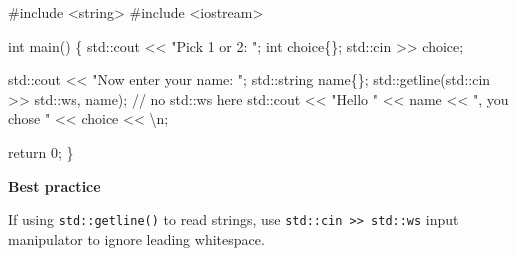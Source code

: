 \documentclass[
  letterpaper,
  DIV=11,
  numbers=noendperiod]{scrreprt}
\newenvironment{Shaded}{\begin{snugshade}}{\end{snugshade}}
\newcommand{\CommentTok}[1]{\textcolor[rgb]{0.37,0.37,0.37}{#1}}
\newcommand{\DecValTok}[1]{\textcolor[rgb]{0.68,0.00,0.00}{#1}}
\newcommand{\ErrorTok}[1]{\textcolor[rgb]{0.68,0.00,0.00}{#1}}
\newcommand{\FunctionTok}[1]{\textcolor[rgb]{0.28,0.35,0.67}{#1}}
\newcommand{\NormalTok}[1]{\textcolor[rgb]{0.00,0.23,0.31}{#1}}
\newcommand{\SpecialCharTok}[1]{\textcolor[rgb]{0.37,0.37,0.37}{#1}}
\newcommand{\StringTok}[1]{\textcolor[rgb]{0.13,0.47,0.30}{#1}}
\begin{document}
\begin{Shaded}
\begin{Highlighting}[]
\CommentTok{\#include \textless{}string\textgreater{}}
\CommentTok{\#include \textless{}iostream\textgreater{}}

\NormalTok{int }\FunctionTok{main}\NormalTok{()}
\NormalTok{\{}
\NormalTok{    std}\SpecialCharTok{::}\NormalTok{cout }\SpecialCharTok{\textless{}}\ErrorTok{\textless{}} \StringTok{"Pick 1 or 2: "}\NormalTok{;}
\NormalTok{    int choice\{\};}
\NormalTok{    std}\SpecialCharTok{::}\NormalTok{cin }\SpecialCharTok{\textgreater{}}\ErrorTok{\textgreater{}}\NormalTok{ choice;}

\NormalTok{    std}\SpecialCharTok{::}\NormalTok{cout }\SpecialCharTok{\textless{}}\ErrorTok{\textless{}} \StringTok{"Now enter your name: "}\NormalTok{;}
\NormalTok{    std}\SpecialCharTok{::}\NormalTok{string name\{\};}
\NormalTok{    std}\SpecialCharTok{::}\FunctionTok{getline}\NormalTok{(std}\SpecialCharTok{::}\NormalTok{cin }\SpecialCharTok{\textgreater{}}\ErrorTok{\textgreater{}}\NormalTok{ std}\SpecialCharTok{::}\NormalTok{ws, name);        }\SpecialCharTok{/}\ErrorTok{/}\NormalTok{ no std}\SpecialCharTok{::}\NormalTok{ws here}
\NormalTok{    std}\SpecialCharTok{::}\NormalTok{cout }\SpecialCharTok{\textless{}}\ErrorTok{\textless{}} \StringTok{"Hello "} \SpecialCharTok{\textless{}}\ErrorTok{\textless{}}\NormalTok{ name }\SpecialCharTok{\textless{}}\ErrorTok{\textless{}} \StringTok{", you chose "} \SpecialCharTok{\textless{}}\ErrorTok{\textless{}}\NormalTok{ choice }\SpecialCharTok{\textless{}}\ErrorTok{\textless{}} \StringTok{\textquotesingle{}}\SpecialCharTok{\textbackslash{}n}\StringTok{\textquotesingle{}}\NormalTok{;}

\NormalTok{    return }\DecValTok{0}\NormalTok{;}
\NormalTok{\}}
\end{Highlighting}
\end{Shaded}

\begin{tcolorbox}[enhanced jigsaw, toprule=.15mm, rightrule=.15mm, opacityback=0, breakable, leftrule=.75mm, colback=white, colframe=quarto-callout-tip-color-frame, arc=.35mm, left=2mm, bottomrule=.15mm]
\begin{minipage}[t]{5.5mm}
\textcolor{quarto-callout-tip-color}{\faLightbulb}
\end{minipage}%
\begin{minipage}[t]{\textwidth - 5.5mm}

\textbf{Best practice}\vspace{2mm}

If using \texttt{std::getline()} to read strings, use
\texttt{std::cin\ \textgreater{}\textgreater{}\ std::ws} input
manipulator to ignore leading whitespace.

\end{minipage}%
\end{tcolorbox}
\end{document}

